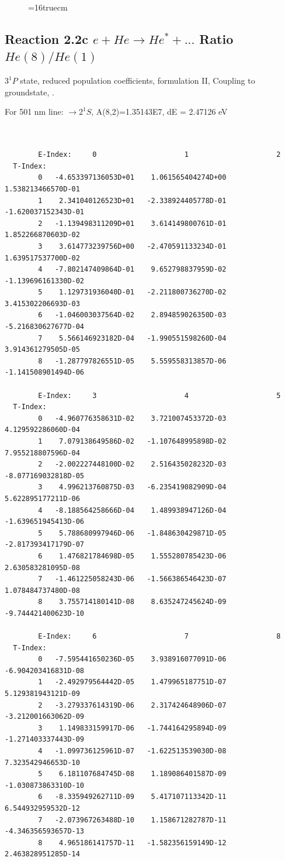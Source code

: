 \documentclass[12pt,dvips]{article}
\begin{document}
\begin{figure} \label{2.2b}
\epsfxsize=16truecm
\end{figure}
\newpage


\subsection{
  Reaction 2.2c $e + He \rightarrow He^* + ... $ Ratio $He(8)/He(1)$
}

  $3^1P$ state,
  reduced population coefficients, formulation II,
  Coupling to groundstate, \cite{kn:Fujimoto}.

  For 501 nm line: $\rightarrow 2^1S$, A(8,2)=1.35143E7, dE = 2.47126 eV

\begin{small}\begin{verbatim}


        E-Index:     0                     1                     2
  T-Index:
        0   -4.653397136053D+01    1.061565404274D+00    1.538213466570D-01
        1    2.341040126523D+01   -2.338924405778D-01   -1.620037152343D-01
        2   -1.139498311209D+01    3.614149800761D-01    1.852266870603D-02
        3    3.614773239756D+00   -2.470591133234D-01    1.639517537700D-02
        4   -7.802147409864D-01    9.652798837959D-02   -1.139696161330D-02
        5    1.129731936040D-01   -2.211800736270D-02    3.415302206693D-03
        6   -1.046003037564D-02    2.894859026350D-03   -5.216830627677D-04
        7    5.566146923182D-04   -1.990551598260D-04    3.914361279505D-05
        8   -1.287797826551D-05    5.559558313857D-06   -1.141508901494D-06

        E-Index:     3                     4                     5
  T-Index:
        0   -4.960776358631D-02    3.721007453372D-03    4.129592286060D-04
        1    7.079138649586D-02   -1.107648995898D-02    7.955218807596D-04
        2   -2.002227448100D-02    2.516435028232D-03   -8.077169032818D-05
        3    4.996213760875D-03   -6.235419082909D-04    5.622895177211D-06
        4   -8.188564258666D-04    1.489938947126D-04   -1.639651945413D-06
        5    5.788680997946D-06   -1.848630429871D-05   -2.817393417179D-07
        6    1.476821784698D-05    1.555280785423D-06    2.630583281095D-08
        7   -1.461225058243D-06   -1.566386546423D-07    1.078484737480D-08
        8    3.755714180141D-08    8.635247245624D-09   -9.744421400623D-10

        E-Index:     6                     7                     8
  T-Index:
        0   -7.595441650236D-05    3.938916077091D-06   -6.904203416831D-08
        1   -2.492979564442D-05    1.479965187751D-07    5.129381943121D-09
        2   -3.279337614319D-06    2.317424648906D-07   -3.212001663062D-09
        3    1.149833159917D-06   -1.744164295894D-09   -1.271403337443D-09
        4   -1.099736125961D-07   -1.622513539030D-08    7.323542946653D-10
        5    6.181107684745D-08    1.189086401587D-09   -1.030873863310D-10
        6   -8.335949262711D-09    5.417107113342D-11    6.544932959532D-12
        7   -2.073967263488D-10    1.158671282787D-11   -4.346356593657D-13
        8    4.965186141757D-11   -1.582356159149D-12    2.463828951285D-14


\end{verbatim}
\end{small}
\end{document}
